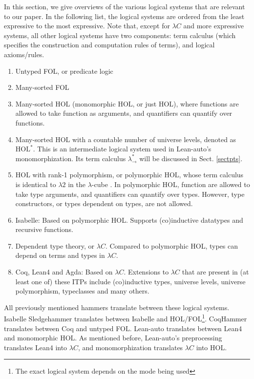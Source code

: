   In this section, we give overviews of the various logical systems
  that are relevant to our paper. In the following list, the logical systems
  are ordered from the least expressive to the most expressive. Note that, except
  for $\lambda C$ and more expressive systems, all other logical systems have
  two components: term calculus (which specifies the construction and computation
  rules of terms), and logical axioms/rules.
  \begin{enumerate}
    \item Untyped FOL, or predicate logic
    \item Many-sorted FOL
    \item Many-sorted HOL (monomorphic HOL, or just HOL), where functions are allowed
      to take function as arguments, and quantifiers can quantify over functions.
    \item Many-sorted HOL with a countable number of universe levels, denoted as $\text{HOL}^*$. This is an
      intermediate logical system used in Lean-auto's monomorphization. Its term calculus $\lambda_\to^*$
      will be discussed in Sect. \ref{sectpts}.
    \item HOL with rank-1 polymorphism, or polymorphic HOL, whose term calculus is identical
      to $\lambda 2$ in the $\lambda$-cube \cite{LambdaWithType}. In polymorphic HOL, function are
      allowed to take type arguments, and quantifiers can quantify over types. However, type
      constructors, or types dependent on types, are not allowed.
    \item Isabelle: Based on polymorphic HOL. Supports (co)inductive datatypes and recursive functions.
    \item Dependent type theory, or $\lambda C$. Compared to polymorphic HOL, types can depend on terms and types in $\lambda C$.
    \item Coq, Lean4 and Agda: Based on $\lambda C$. Extensions to $\lambda C$ that are
      present in (at least one of) these ITPs include (co)inductive types, universe levels,
      universe polymorphism, typeclasses and many others.
  \end{enumerate}
  
  \noindent All previously mentioned hammers translate between these logical systems. Isabelle
  Sledgehammer translates between Isabelle and
  HOL/FOL\footnote{The exact logical system depends on the mode being used}.
  CoqHammer translates between Coq and untyped FOL. Lean-auto translates
  between Lean4 and monomorphic HOL. As mentioned before, Lean-auto's
  preprocessing translates Lean4 into $\lambda C$, and monomorphization
  translates $\lambda C$ into HOL.

